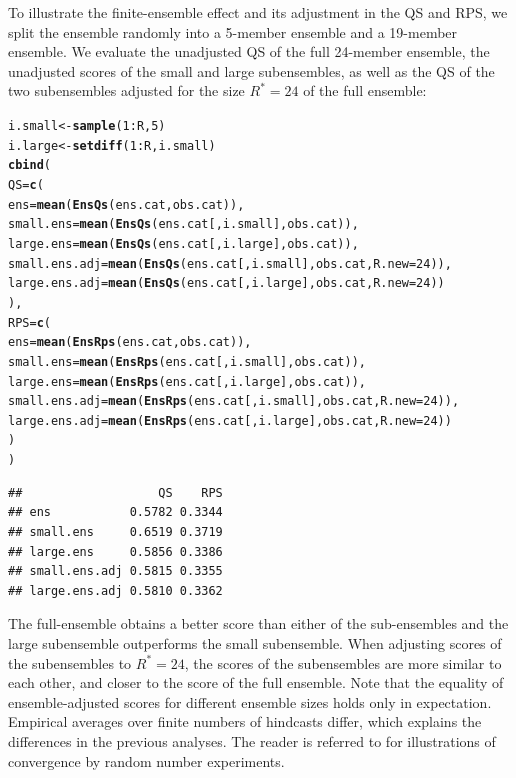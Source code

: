 \documentclass[article]{jss}\usepackage{graphicx, color}
\makeatletter
\newcommand{\hlfunctioncall}[1]{\textcolor[rgb]{0,0.501960784313725,0.752941176470588}{\textbf{#1}}}%
\newenvironment{kframe}{%
 \def\at@end@of@kframe{}%
 \ifinner\ifhmode%
  \def\at@end@of@kframe{\end{minipage}}%
  \begin{minipage}{\columnwidth}%
 \fi\fi%
 \def\FrameCommand##1{\hskip\@totalleftmargin \hskip-\fboxsep
 \colorbox{shadecolor}{##1}\hskip-\fboxsep
     \hskip-\linewidth \hskip-\@totalleftmargin \hskip\columnwidth}%
 \MakeFramed {\advance\hsize-\width
   \@totalleftmargin\z@ \linewidth\hsize
   \@setminipage}}%
 {\par\unskip\endMakeFramed%
 \at@end@of@kframe}
\newenvironment{knitrout}{}{} %
\makeatother
\begin{document}
To illustrate the finite-ensemble effect and its adjustment in the QS and RPS, we split the ensemble randomly into a 5-member ensemble and a 19-member ensemble. 
We evaluate the unadjusted QS of the full 24-member ensemble, the unadjusted scores of the small and large subensembles, as well as the QS of the two subensembles adjusted for the size $R^*=24$ of the full ensemble:
%
\begin{knitrout}
\color{fgcolor}\begin{kframe}
\begin{alltt}
i.small <- \hlfunctioncall{sample}(1:R, 5)
i.large <- \hlfunctioncall{setdiff}(1:R, i.small)
\hlfunctioncall{cbind}(
 QS = \hlfunctioncall{c}(
  ens           = \hlfunctioncall{mean}(\hlfunctioncall{EnsQs}(ens.cat,            obs.cat)),
  small.ens     = \hlfunctioncall{mean}(\hlfunctioncall{EnsQs}(ens.cat[, i.small], obs.cat)),
  large.ens     = \hlfunctioncall{mean}(\hlfunctioncall{EnsQs}(ens.cat[, i.large], obs.cat)),
  small.ens.adj = \hlfunctioncall{mean}(\hlfunctioncall{EnsQs}(ens.cat[, i.small], obs.cat, R.new=24)),
  large.ens.adj = \hlfunctioncall{mean}(\hlfunctioncall{EnsQs}(ens.cat[, i.large], obs.cat, R.new=24))
 ),
 RPS = \hlfunctioncall{c}(
  ens           = \hlfunctioncall{mean}(\hlfunctioncall{EnsRps}(ens.cat,            obs.cat)),
  small.ens     = \hlfunctioncall{mean}(\hlfunctioncall{EnsRps}(ens.cat[, i.small], obs.cat)),
  large.ens     = \hlfunctioncall{mean}(\hlfunctioncall{EnsRps}(ens.cat[, i.large], obs.cat)),
  small.ens.adj = \hlfunctioncall{mean}(\hlfunctioncall{EnsRps}(ens.cat[, i.small], obs.cat, R.new=24)),
  large.ens.adj = \hlfunctioncall{mean}(\hlfunctioncall{EnsRps}(ens.cat[, i.large], obs.cat, R.new=24))
 )
)
\end{alltt}
\begin{verbatim}
##                   QS    RPS
## ens           0.5782 0.3344
## small.ens     0.6519 0.3719
## large.ens     0.5856 0.3386
## small.ens.adj 0.5815 0.3355
## large.ens.adj 0.5810 0.3362
\end{verbatim}
\end{kframe}
\end{knitrout}

%
The full-ensemble obtains a better score than either of the sub-ensembles and the large subensemble outperforms the small subensemble.
When adjusting scores of the subensembles to $R^*=24$, the scores of the subensembles are more similar to each other, and closer to the score of the full ensemble.
Note that the equality of ensemble-adjusted scores for different ensemble sizes holds only in expectation. 
Empirical averages over finite numbers of hindcasts differ, which explains the differences in the previous analyses.
The reader is referred to \citet{ferro2013fair} for illustrations of convergence by random number experiments.
\end{document}
